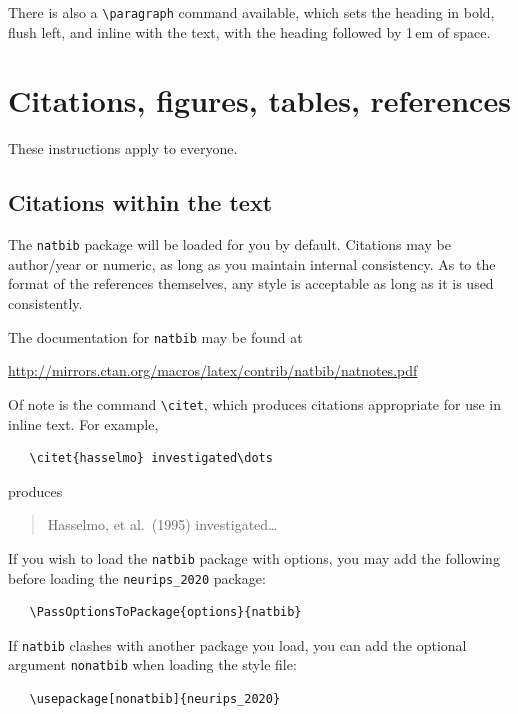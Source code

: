 \documentclass{article}
\begin{document}
There is also a \verb+\paragraph+ command available, which sets the heading in
bold, flush left, and inline with the text, with the heading followed by 1\,em
of space.

\section{Citations, figures, tables, references}
\label{others}

These instructions apply to everyone.

\subsection{Citations within the text}

The \verb+natbib+ package will be loaded for you by default.  Citations may be
author/year or numeric, as long as you maintain internal consistency.  As to the
format of the references themselves, any style is acceptable as long as it is
used consistently.

The documentation for \verb+natbib+ may be found at
\begin{center}
  \url{http://mirrors.ctan.org/macros/latex/contrib/natbib/natnotes.pdf}
\end{center}
Of note is the command \verb+\citet+, which produces citations appropriate for
use in inline text.  For example,
\begin{verbatim}
   \citet{hasselmo} investigated\dots
\end{verbatim}
produces
\begin{quote}
  Hasselmo, et al.\ (1995) investigated\dots
\end{quote}

If you wish to load the \verb+natbib+ package with options, you may add the
following before loading the \verb+neurips_2020+ package:
\begin{verbatim}
   \PassOptionsToPackage{options}{natbib}
\end{verbatim}

If \verb+natbib+ clashes with another package you load, you can add the optional
argument \verb+nonatbib+ when loading the style file:
\begin{verbatim}
   \usepackage[nonatbib]{neurips_2020}
\end{verbatim}
\end{document}

